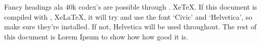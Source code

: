 \documentclass{report}
\begin{document}
\begin{multicols}{3}
Fancy headings ala 40k codex's are possible through \ifxetex \XeTeX. \else XeTeX. \fi If this document is compiled with \ifxetex \XeLaTeX , \else XeLaTeX, \fi it will try and use the font `Civic' and `Helvetica', so make sure they're installed. If not, Helvetica will be used throughout. The rest of this document is Lorem Ipsum to show how how good it is.

\end{multicols}


\begin{multicols}{3}
\blinddocument
\end{multicols}
\end{document}
